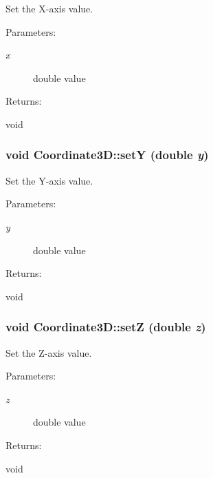 Set the X-axis value. \begin{Desc}
\item[Parameters: ]\par
\begin{description}
\item[{\em 
x}]double value \end{description}
\end{Desc}
\begin{Desc}
\item[Returns: ]\par
void \end{Desc}
\subsubsection{\setlength{\rightskip}{0pt plus 5cm}void Coordinate3D::set\-Y (double {\em y})\hspace{0.3cm}{\tt  [inline]}}\label{classCoordinate3D_a4}


Set the Y-axis value. \begin{Desc}
\item[Parameters: ]\par
\begin{description}
\item[{\em 
y}]double value \end{description}
\end{Desc}
\begin{Desc}
\item[Returns: ]\par
void \end{Desc}
\subsubsection{\setlength{\rightskip}{0pt plus 5cm}void Coordinate3D::set\-Z (double {\em z})\hspace{0.3cm}{\tt  [inline]}}\label{classCoordinate3D_a5}


Set the Z-axis value. \begin{Desc}
\item[Parameters: ]\par
\begin{description}
\item[{\em 
z}]double value \end{description}
\end{Desc}
\begin{Desc}
\item[Returns: ]\par
void \end{Desc}
